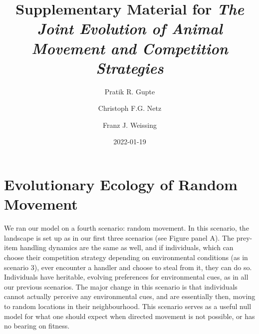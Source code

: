 \documentclass[]{article}
\title{Supplementary Material for \emph{The Joint Evolution of Animal Movement and Competition Strategies}}
\author{Pratik R. Gupte \and Christoph F.G. Netz \and Franz J. Weissing}
\date{2022-01-19}
\begin{document}
\maketitle

{
\setcounter{tocdepth}{2}
\tableofcontents
}
\newpage

\hypertarget{evolutionary-ecology-of-random-movement}{%
\section{Evolutionary Ecology of Random Movement}\label{evolutionary-ecology-of-random-movement}}

We ran our model on a fourth scenario: random movement.
In this scenario, the landscape is set up as in our first three scenarios (see Figure panel A).
The prey-item handling dynamics are the same as well, and if individuals, which can choose their competition strategy depending on environmental conditions (as in scenario 3), ever encounter a handler and choose to steal from it, they can do so.
Individuals have heritable, evolving preferences for environmental cues, as in all our previous scenarios.
The major change in this scenario is that individuals cannot actually perceive any environmental cues, and are essentially then, moving to random locations in their neighbourhood.
This scenario serves as a useful null model for what one should expect when directed movement is not possible, or has no bearing on fitness.
\end{document}

